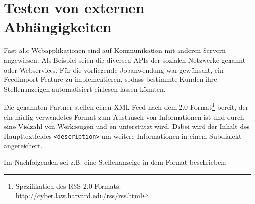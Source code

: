 \section{Testen von externen Abhängigkeiten}
\label{sec:awmock}
Fast alle Webapplikationen sind auf Kommunikation mit anderen Servern angewiesen. Als Beispiel seien die diversen APIs der sozialen Netzwerke genannt oder Webservices. Für die vorliegende Jobanwendung war gewünscht, ein Feedimport-Feature zu implementieren, sodass bestimmte Kunden ihre Stellenanzeigen automatisiert einlesen lassen könnten.

Die genannten Partner stellen einen XML-Feed nach dem  2.0 Format\footnote{Spezifikation des RSS 2.0 Formats: \url{http://cyber.law.harvard.edu/rss/rss.html}} bereit, der ein häufig verwendetes Format zum Austausch von Informationen ist und durch eine Vielzahl von Werkzeugen und en unterstützt wird.
Dabei wird der Inhalt des Haupttextfeldes \verb|<description>| um weitere Informationen in einem Subdialekt angereichert.

Im Nachfolgenden sei z.B. eine Stellenanzeige in dem Format beschrieben:

